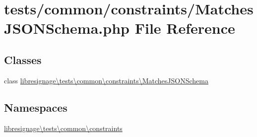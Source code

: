 \hypertarget{MatchesJSONSchema_8php}{}\section{tests/common/constraints/\+Matches\+J\+S\+O\+N\+Schema.php File Reference}
\label{MatchesJSONSchema_8php}
\subsection*{Classes}
\begin{DoxyCompactItemize}
\item 
class \hyperlink{classlibresignage_1_1tests_1_1common_1_1constraints_1_1MatchesJSONSchema}{libresignage\textbackslash{}tests\textbackslash{}common\textbackslash{}constraints\textbackslash{}\+Matches\+J\+S\+O\+N\+Schema}
\end{DoxyCompactItemize}
\subsection*{Namespaces}
\begin{DoxyCompactItemize}
\item 
 \hyperlink{namespacelibresignage_1_1tests_1_1common_1_1constraints}{libresignage\textbackslash{}tests\textbackslash{}common\textbackslash{}constraints}
\end{DoxyCompactItemize}
